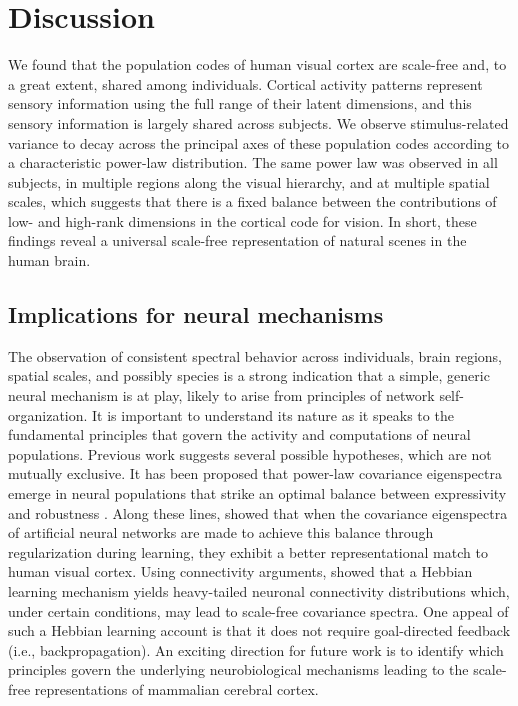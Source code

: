 \documentclass[10pt]{article}
\begin{document}
\section{Discussion}\label{discussion}

We found that the population codes of human visual cortex are scale-free and, to a great extent, shared among individuals. Cortical activity patterns represent sensory information using the full range of their latent dimensions, and this sensory information is largely shared across subjects. We observe stimulus-related variance to decay across the principal axes of these population codes according to a characteristic power-law distribution. The same power law was observed in all subjects, in multiple regions along the visual hierarchy, and at multiple spatial scales, which suggests that there is a fixed balance between the contributions of low- and high-rank dimensions in the cortical code for vision. In short, these findings reveal a universal scale-free representation of natural scenes in the human brain.

\subsection{Implications for neural mechanisms}\label{implications-for-neural-mechanisms}

The observation of consistent spectral behavior across individuals, brain regions, spatial scales, and possibly species is a strong indication that a simple, generic neural mechanism is at play, likely to arise from principles of network self-organization. It is important to understand its nature as it speaks to the fundamental principles that govern the activity and computations of neural populations. Previous work suggests several possible hypotheses, which are not mutually exclusive. It has been proposed that power-law covariance eigenspectra emerge in neural populations that strike an optimal balance between expressivity and robustness \autocite{Stringer2019}. Along these lines, \textcite{Prince2024} showed that when the covariance eigenspectra of artificial neural networks are made to achieve this balance through regularization during learning, they exhibit a better representational match to human visual cortex. Using connectivity arguments, \textcite{Lynn2024} showed that a Hebbian learning mechanism yields heavy-tailed neuronal connectivity distributions which, under certain conditions, may lead to scale-free covariance spectra. One appeal of such a Hebbian learning account is that it does not require goal-directed feedback (i.e., backpropagation). An exciting direction for future work is to identify which principles govern the underlying neurobiological mechanisms leading to the scale-free representations of mammalian cerebral cortex.
\end{document}

